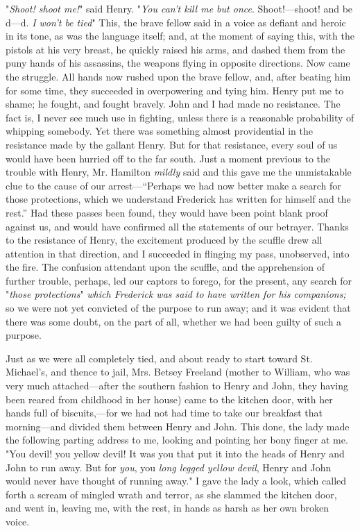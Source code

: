 "\emph{Shoot! shoot me!}" said Henry. "\emph{You can't kill me but
once}. Shoot!---shoot! and be d---d. \emph{I won't be tied}" This, the
brave fellow said in a voice as defiant and heroic in its tone, as was
the language itself; and, at the moment of saying this, with the pistols
at his very breast, he quickly raised his arms, and dashed them from the
puny hands of his assassins, the weapons flying in opposite directions.
Now came the struggle. All hands now rushed upon the brave fellow, and,
after beating him for some time, they succeeded in overpowering and
tying him. Henry put me to shame; he fought, and fought bravely. John
and I had made no resistance. The fact is, I never see much use in
fighting, unless there is a reasonable probability of whipping somebody.
Yet there was something almost providential in the resistance made by
the gallant Henry. But for that resistance, every soul of us would have
been hurried off to the far south. Just a moment previous to the trouble
with Henry, Mr. Hamilton \emph{mildly} said and this gave me the
unmistakable clue to the cause of our arrest---``Perhaps we had now
better make a search for those protections, which we understand
Frederick has written for himself and the rest.'' Had these passes been
found, they would have been point blank proof against us, and would have
confirmed all the statements of our betrayer. Thanks to the resistance
of Henry, the excitement produced by the scuffle drew all attention in
that direction, and I succeeded in flinging my pass, unobserved, into
the fire. {\protect\hypertarget{294}{}{}}The confusion attendant upon
the scuffle, and the apprehension of further trouble, perhaps, led our
captors to forego, for the present, any search for "\emph{those
protections}" \emph{which Frederick was said to have written for his
companions;} so we were not yet convicted of the purpose to run away;
and it was evident that there was some doubt, on the part of all,
whether we had been guilty of such a purpose.

Just as we were all completely tied, and about ready to start toward St.
Michael's, and thence to jail, Mrs. Betsey Freeland (mother to William,
who was very much attached---after the southern fashion to Henry and
John, they having been reared from childhood in her house) came to the
kitchen door, with her hands full of biscuits,---for we had not had time
to take our breakfast that morning---and divided them between Henry and
John. This done, the lady made the following parting address to me,
looking and pointing her bony finger at me. "You devil! you yellow
devil! It was you that put it into the heads of Henry and John to run
away. But for \emph{you}, you \emph{long legged yellow devil}, Henry and
John would never have thought of running away." I gave the lady a look,
which called forth a scream of mingled wrath and terror, as she slammed
the kitchen door, and went in, leaving me, with the rest, in hands as
harsh as her own broken voice.

